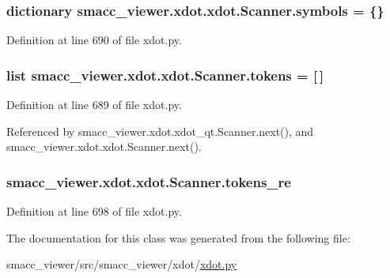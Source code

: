 \subsubsection[{\texorpdfstring{symbols}{symbols}}]{\setlength{\rightskip}{0pt plus 5cm}dictionary smacc\+\_\+viewer.\+xdot.\+xdot.\+Scanner.\+symbols = \{\}\hspace{0.3cm}{\ttfamily [static]}}\hypertarget{classsmacc__viewer_1_1xdot_1_1xdot_1_1Scanner_a1e1208f35dbfc3ad5c2c6a28b99cde53}{}\label{classsmacc__viewer_1_1xdot_1_1xdot_1_1Scanner_a1e1208f35dbfc3ad5c2c6a28b99cde53}


Definition at line 690 of file xdot.\+py.

\subsubsection[{\texorpdfstring{tokens}{tokens}}]{\setlength{\rightskip}{0pt plus 5cm}list smacc\+\_\+viewer.\+xdot.\+xdot.\+Scanner.\+tokens = \mbox{[}$\,$\mbox{]}\hspace{0.3cm}{\ttfamily [static]}}\hypertarget{classsmacc__viewer_1_1xdot_1_1xdot_1_1Scanner_a9c1c5b5b90c3d4282b56edf396a822b3}{}\label{classsmacc__viewer_1_1xdot_1_1xdot_1_1Scanner_a9c1c5b5b90c3d4282b56edf396a822b3}


Definition at line 689 of file xdot.\+py.



Referenced by smacc\+\_\+viewer.\+xdot.\+xdot\+\_\+qt.\+Scanner.\+next(), and smacc\+\_\+viewer.\+xdot.\+xdot.\+Scanner.\+next().

\subsubsection[{\texorpdfstring{tokens\+\_\+re}{tokens_re}}]{\setlength{\rightskip}{0pt plus 5cm}smacc\+\_\+viewer.\+xdot.\+xdot.\+Scanner.\+tokens\+\_\+re}\hypertarget{classsmacc__viewer_1_1xdot_1_1xdot_1_1Scanner_a14859d0283cb278fc3526eb313a1c4b3}{}\label{classsmacc__viewer_1_1xdot_1_1xdot_1_1Scanner_a14859d0283cb278fc3526eb313a1c4b3}


Definition at line 698 of file xdot.\+py.



The documentation for this class was generated from the following file\+:\begin{DoxyCompactItemize}
\item 
smacc\+\_\+viewer/src/smacc\+\_\+viewer/xdot/\hyperlink{xdot_8py}{xdot.\+py}\end{DoxyCompactItemize}

